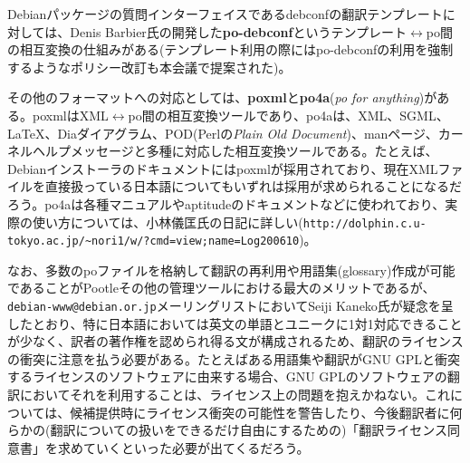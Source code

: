 \documentclass[mingoth,a4paper]{jsarticle}
\begin{document}
Debianパッケージの質問インターフェイスであるdebconfの翻訳テンプレートに対しては、Denis Barbier氏の開発した\textbf{po-debconf}というテンプレート$\leftrightarrow$po間の相互変換の仕組みがある(テンプレート利用の際にはpo-debconfの利用を強制するようなポリシー改訂も本会議で提案された)。

その他のフォーマットへの対応としては、\textbf{poxml}と\textbf{po4a}(\emph{po for anything})がある。poxmlはXML$\leftrightarrow$po間の相互変換ツールであり、po4aは、XML、SGML、LaTeX、Diaダイアグラム、POD(Perlの\emph{Plain Old Document})、manページ、カーネルヘルプメッセージと多種に対応した相互変換ツールである。たとえば、Debianインストーラのドキュメントにはpoxmlが採用されており、現在XMLファイルを直接扱っている日本語についてもいずれは採用が求められることになるだろう。po4aは各種マニュアルやaptitudeのドキュメントなどに使われており、実際の使い方については、小林儀匡氏の日記に詳しい(\texttt{http://dolphin.c.u-tokyo.ac.jp/\textasciitilde nori1/w/?cmd=view;name=Log200610})。



なお、多数のpoファイルを格納して翻訳の再利用や用語集(glossary)作成が可能であることがPootleその他の管理ツールにおける最大のメリットであるが、\texttt{debian-www@debian.or.jp}メーリングリストにおいてSeiji Kaneko氏が疑念を呈したとおり、特に日本語においては英文の単語とユニークに1対1対応できることが少なく、訳者の著作権を認められ得る文が構成されるため、翻訳のライセンスの衝突に注意を払う必要がある。たとえばある用語集や翻訳がGNU GPLと衝突するライセンスのソフトウェアに由来する場合、GNU GPLのソフトウェアの翻訳においてそれを利用することは、ライセンス上の問題を抱えかねない。これについては、候補提供時にライセンス衝突の可能性を警告したり、今後翻訳者に何らかの(翻訳についての扱いをできるだけ自由にするための)「翻訳ライセンス同意書」を求めていくといった必要が出てくるだろう。
\end{document}
